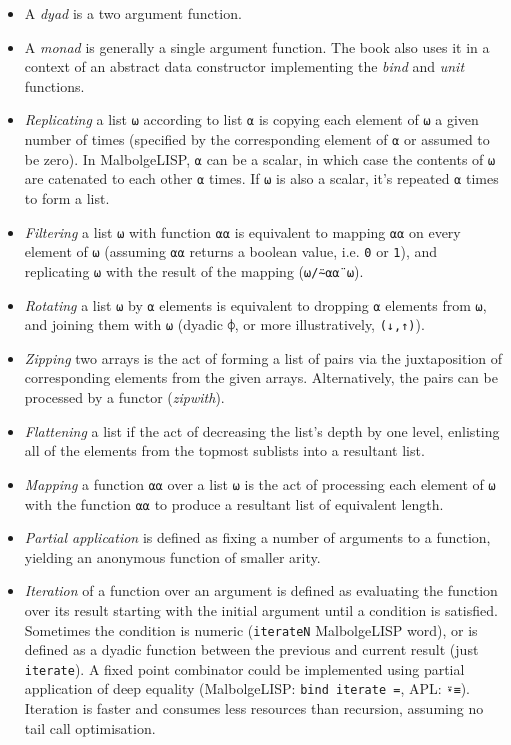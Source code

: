 \begin{itemize}
    \item A \textit{dyad} is a two argument function.
    \item A \textit{monad} is generally a single argument function. The book also uses it in a context of an abstract data constructor implementing the \textit{bind} and \textit{unit} functions.
    \item \textit{Replicating} a list \verb|⍵| according to list \verb|⍺| is copying each element of \verb|⍵| a given number of times (specified by the corresponding element of \verb|⍺| or assumed to be zero). In MalbolgeLISP, \verb|⍺| can be a scalar, in which case the contents of \verb|⍵| are catenated to each other \verb|⍺| times. If \verb|⍵| is also a scalar, it's repeated \verb|⍺| times to form a list.
    \item \textit{Filtering} a list \verb|⍵| with function \verb|⍺⍺| is equivalent to mapping \verb|⍺⍺| on every element of \verb|⍵| (assuming \verb|⍺⍺| returns a boolean value, i.e. \verb|0| or \verb|1|), and replicating \verb|⍵| with the result of the mapping (\verb|⍵/⍨⍺⍺¨⍵|).
    \item \textit{Rotating} a list \verb|⍵| by \verb|⍺| elements is equivalent to dropping \verb|⍺| elements from \verb|⍵|, and joining them with \verb|⍵| (dyadic \verb|⌽|, or more illustratively, \verb|(↓,↑)|).
    \item \textit{Zipping} two arrays is the act of forming a list of pairs via the juxtaposition of corresponding elements from the given arrays. Alternatively, the pairs can be processed by a functor (\textit{zipwith}).
    \item \textit{Flattening} a list if the act of decreasing the list's depth by one level, enlisting all of the elements from the topmost sublists into a resultant list.
    \item \textit{Mapping} a function \verb|⍺⍺| over a list \verb|⍵| is the act of processing each element of \verb|⍵| with the function \verb|⍺⍺| to produce a resultant list of equivalent length.
    \item \textit{Partial application} is defined as fixing a number of arguments to a function, yielding an anonymous function of smaller arity.
    \item \textit{Iteration} of a function over an argument is defined as evaluating the function over its result starting with the initial argument until a condition is satisfied. Sometimes the condition is numeric (\verb|iterateN| MalbolgeLISP word), or is defined as a dyadic function between the previous and current result (just \verb|iterate|). A fixed point combinator could be implemented using partial application of deep equality (MalbolgeLISP: \verb|bind iterate =|, APL: \verb|⍣≡|). Iteration is faster and consumes less resources than recursion, assuming no tail call optimisation.

\end{itemize}
